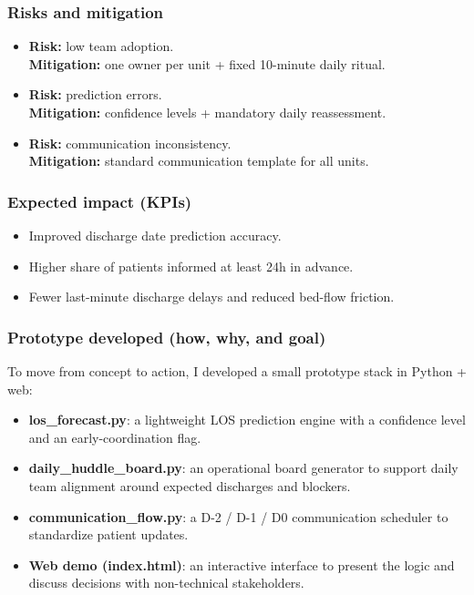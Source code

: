 {\subsubsection{Risks and mitigation}
\begin{itemize}
  \item \textbf{Risk:} low team adoption. \\
  \textbf{Mitigation:} one owner per unit + fixed 10-minute daily ritual.
  \item \textbf{Risk:} prediction errors. \\
  \textbf{Mitigation:} confidence levels + mandatory daily reassessment.
  \item \textbf{Risk:} communication inconsistency. \\
  \textbf{Mitigation:} standard communication template for all units.
\end{itemize}

\subsubsection{Expected impact (KPIs)}
\begin{itemize}
  \item Improved discharge date prediction accuracy.
  \item Higher share of patients informed at least 24h in advance.
  \item Fewer last-minute discharge delays and reduced bed-flow friction.
\end{itemize}

\subsubsection{Prototype developed (how, why, and goal)}
To move from concept to action, I developed a small prototype stack in Python + web:
\begin{itemize}
  \item \textbf{los\_forecast.py}: a lightweight LOS prediction engine with a confidence level and an early-coordination flag.
  \item \textbf{daily\_huddle\_board.py}: an operational board generator to support daily team alignment around expected discharges and blockers.
  \item \textbf{communication\_flow.py}: a D-2 / D-1 / D0 communication scheduler to standardize patient updates.
  \item \textbf{Web demo (index.html)}: an interactive interface to present the logic and discuss decisions with non-technical stakeholders.
\end{itemize}

}

